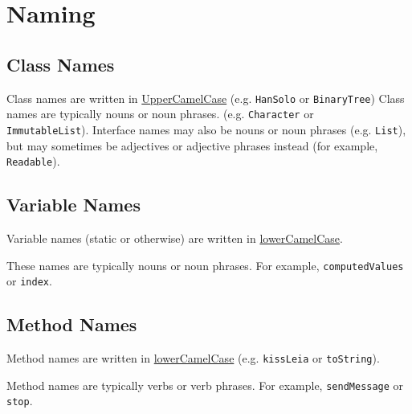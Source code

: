 \documentclass[11pt,DIV=23,landscape]{scrartcl}
\begin{document}
\newpage
\section{Naming}\label{naming}

\begin{paracol}{3}
\begin{nthcolumn}{0}
\subsection{Class Names}\label{class-names}

Class names are written in
\href{https://google.github.io/styleguide/javaguide.html\#s5.3-camel-case}{UpperCamelCase}
(e.g. \lstinline{HanSolo} or \lstinline{BinaryTree}) Class names are typically
nouns or noun phrases. (e.g. \lstinline{Character} or
\\ \lstinline{ImmutableList}). Interface names may also be nouns or noun
phrases (e.g. \lstinline{List}), but may sometimes be adjectives or
adjective phrases instead (for example, \lstinline{Readable}).

\end{nthcolumn}
\begin{nthcolumn}{1}

\subsection{Variable Names}\label{variable-names}

Variable names (static or otherwise) are written in
\href{https://google.github.io/styleguide/javaguide.html\#s5.3-camel-case}{lowerCamelCase}.

These names are typically nouns or noun phrases. For example,
\lstinline{computedValues} or \lstinline{index}.

\end{nthcolumn}
\begin{nthcolumn}{2}
\subsection{Method Names}\label{method-names}

Method names are written in \href{https://google.github.io/styleguide/javaguide.html\#s5.3-camel-case}{lowerCamelCase}
(e.g. \lstinline{kissLeia} or \lstinline{toString}).

Method names are typically verbs or verb phrases. For example,
\lstinline{sendMessage} or \lstinline{stop}.
\end{nthcolumn}
\end{paracol}
\end{document}
